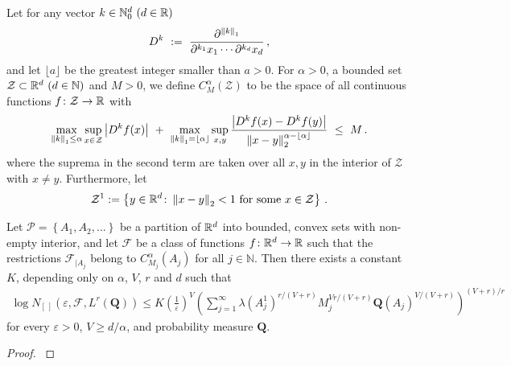 Let for any vector $k\in\mathbb{N}_0^d \ (d\in\R)$
\begin{gather*}
  D^k
  \ :=\ 
  \frac
  {\partial^{\norm{k}_1}}
  {
    \partial^{k_1}x_1
    \cdots
    \partial^{k_d}x_d
  }
  \,,
\end{gather*}
and let $\lfloor a \rfloor$ be the greatest integer smaller than $a>0$.
For $\alpha>0$, a bounded set 
$\mathcal{Z}\subset\R^d\ (d\in\mathbb{N})$
and
$M>0$, we define $C^\alpha_M(\mathcal{Z})$ to be the space of all continuous functions $f\colon \mathcal{Z}\to\mathbb{R}$ with
\begin{gather*}
  \max_{\norm{k}_1\le \alpha}\sup_{x\in\mathcal{Z}}
  \left| D^k f(x) \right|
  \ 
  +
  \ 
  \max_{\norm{k}_1=\lfloor \alpha \rfloor}\sup_{x,y}
  \frac
  {
  \left|
  D^k f(x) 
  -
  D^k f(y) 
  \right|
  }
  {
    \norm{x-y}_2^{\alpha-\lfloor \alpha \rfloor}
  }
  \
  \le
  \ 
  M
  \,.
\end{gather*}
where the suprema in the second term are taken over all $x,y$ in the interior of $\mathcal{Z}$ with $x\neq y$.
Furthermore, let
\begin{gather*}
  \mathcal{Z}^1
  :=
  \left\{ 
    y\in\R^d
    \colon
    \norm{x-y}_2 <1
    \ 
    \text{for some}\ x\in\mathcal{Z}
  \right\}
  \,.
\end{gather*}
\begin{lemma}
  \label{vdv_coro}
  Let $\mathcal{P}=\left\{ A_1,A_2,\ldots \right\}$ be a partition of $\mathbb{R}^d$ into bounded, convex sets with non-empty interior, and let $\mathcal{F}$ be a class of functions $f\colon\mathbb{R}^d\to\mathbb{R}$ such that the restrictions $\mathcal{F}_{|A_j}$ belong to $C^\alpha_{M_j}(A_j)$
  for all $j\in\mathbb{N}$.
  Then there exists a constant $K$, depending only on $\alpha$, $V$, $r$ and $d$
  such that
  \begin{gather}
    \label{667}
    \log
    N_{[\,]}
    (
    \varepsilon
    ,
    \mathcal{F}
    ,
    L^r(\mathbf{Q})
    )
    \le
    K
    \left( \frac{1}{\varepsilon} \right)^V
    \left( 
      \sum_{j=1}^{\infty}
      \lambda(A_j^1)^{r/(V+r)}
      M_j^{Vr/(V+r)}
      \mathbf{Q}(A_j)^{V/(V+r)}
    \right)
    ^{(V+r)/r}
  \end{gather}
  for every $\varepsilon>0$, $V\ge d/\alpha$, and probability measure $\mathbf{Q}$.
\end{lemma}
\begin{proof}
  \emph{\cite[Corollary~2.7.4]{vaart2013}}
\end{proof}

